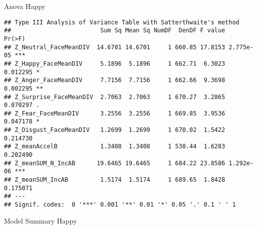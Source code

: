 \documentclass[
]{article}
\begin{document}
Anova Happy

\begin{verbatim}
## Type III Analysis of Variance Table with Satterthwaite's method
##                         Sum Sq Mean Sq NumDF  DenDF F value    Pr(>F)    
## Z_Neutral_FaceMeanDIV  14.6701 14.6701     1 660.85 17.8153 2.775e-05 ***
## Z_Happy_FaceMeanDIV     5.1896  5.1896     1 662.71  6.3023  0.012295 *  
## Z_Anger_FaceMeanDIV     7.7156  7.7156     1 662.66  9.3698  0.002295 ** 
## Z_Surprise_FaceMeanDIV  2.7063  2.7063     1 670.27  3.2865  0.070297 .  
## Z_Fear_FaceMeanDIV      3.2556  3.2556     1 669.85  3.9536  0.047178 *  
## Z_Disgust_FaceMeanDIV   1.2699  1.2699     1 670.02  1.5422  0.214730    
## Z_meanAccelB            1.3408  1.3408     1 538.44  1.6283  0.202490    
## Z_meanSUM_N_IncAB      19.6465 19.6465     1 684.22 23.8586 1.292e-06 ***
## Z_meanSUM_IncAB         1.5174  1.5174     1 689.65  1.8428  0.175071    
## ---
## Signif. codes:  0 '***' 0.001 '**' 0.01 '*' 0.05 '.' 0.1 ' ' 1
\end{verbatim}

Model Summary Happy
\end{document}
